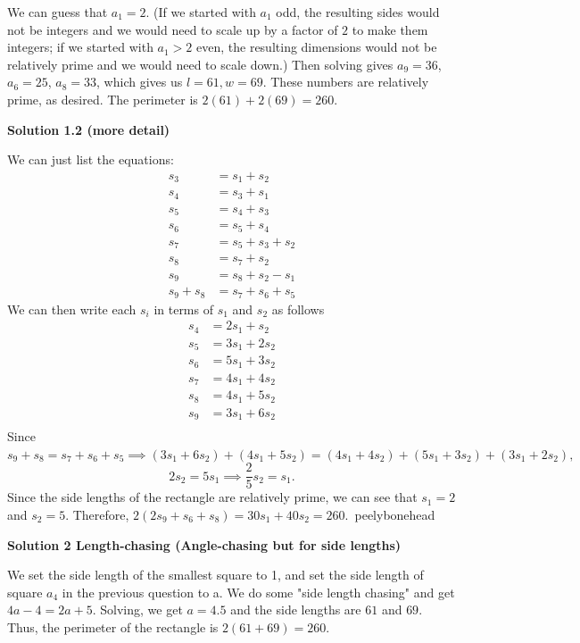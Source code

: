 \begin{enumerate}
 We can guess that $a_1 = 2$. (If we started with $a_1$ odd, the resulting sides would not be integers and we would need to scale up by a factor of $2$ to make them integers; if we started with $a_1 > 2$ even, the resulting dimensions would not be relatively prime and we would need to scale down.) Then solving gives $a_9 = 36$, $a_6=25$, $a_8 = 33$, which gives us $l=61,w=69$.  These numbers are relatively prime, as desired. The perimeter is $2(61)+2(69)=\boxed{260}$.

 



\textbf{Solution 1.2 (more detail)}

We can just list the equations:
 \begin{align*} s_3 &= s_1 + s_2 \\ s_4 &= s_3 + s_1 \\ s_5 &= s_4 + s_3 \\ s_6 &= s_5 + s_4 \\ s_7 &= s_5 + s_3 + s_2 \\ s_8 &= s_7 + s_2 \\ s_9 &= s_8 + s_2 - s_1 \\ s_9 + s_8 &= s_7 + s_6 + s_5 \end{align*}
We can then write each $s_i$ in terms of $s_1$ and $s_2$ as follows
 \begin{align*} s_4 &= 2s_1 + s_2 \\ s_5 &= 3s_1 +2s_2 \\ s_6 &= 5s_1 + 3s_2 \\ s_7 &= 4s_1 + 4s_2 \\ s_8 &= 4s_1 + 5s_2 \\ s_9 &= 3s_1 + 6s_2 \\ \end{align*}
Since $s_9 + s_8 = s_7 + s_6 + s_5 \implies (3s_1 + 6s_2) + (4s_1 + 5s_2) = (4s_1 + 4s_2) + (5s_1 + 3s_2) + (3s_1 + 2s_2),$ 
 \[2s_2 = 5s_1 \implies \frac{2}{5}s_2 = s_1.\]Since the side lengths of the rectangle are relatively prime, we can see that $s_1 = 2$ and $s_2 = 5.$ Therefore, $2(2s_9 + s_6 + s_8) = 30s_1 + 40s_2 = \boxed{260}.$~peelybonehead

 



\textbf{Solution 2 Length-chasing (Angle-chasing but for side lengths)}

We set the side length of the smallest square to 1, and set the side length of square $a_4$ in the previous question to a. We do some "side length chasing" and get $4a - 4 = 2a + 5$. Solving, we get $a = 4.5$ and the side lengths are $61$ and $69$. Thus, the perimeter of the rectangle is $2(61 + 69) = \boxed{260}.$




\end{enumerate}
